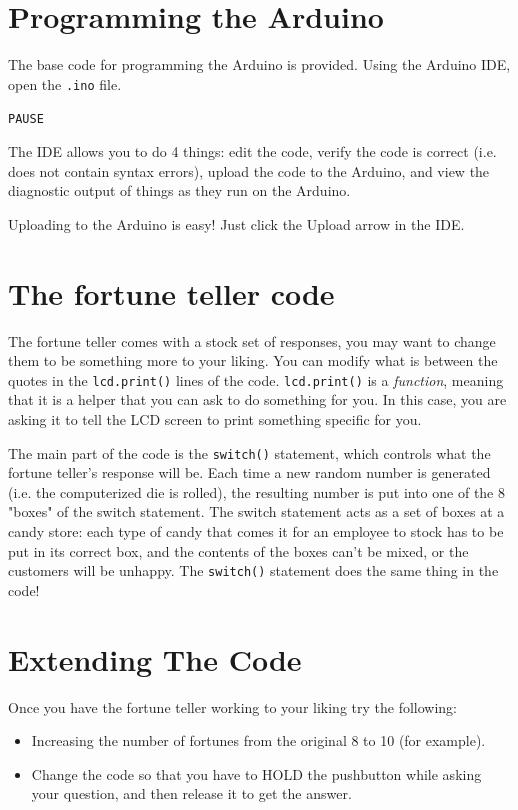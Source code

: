 \documentclass[11pt]{article}
\begin{document}
\section{Programming the Arduino}
\label{sec:org654036c}

The base code for programming the Arduino is provided. Using the Arduino IDE, open the \texttt{.ino} file.

\texttt{PAUSE}

The IDE allows you to do 4 things: edit the code, verify the code is correct (i.e. does not contain syntax
errors), upload the code to the Arduino, and view the diagnostic output of things as they run on the Arduino.

Uploading to the Arduino is easy! Just click the Upload arrow in the IDE.

\section{The fortune teller code}
\label{sec:org4ee1087}

The fortune teller comes with a stock set of responses, you may want to change them to be something more to your
liking. You can modify what is between the quotes in the \texttt{lcd.print()} lines of the code. \texttt{lcd.print()} is a \emph{function},
meaning that it is a helper that you can ask to do something for you. In this case, you are asking it to tell the LCD
screen to print something specific for you.

The main part of the code is the \texttt{switch()} statement, which controls what the fortune teller's response will be. Each
time a new random number is generated (i.e. the computerized die is rolled), the resulting number is put into one of the
8 "boxes" of the switch statement. The switch statement acts as a set of boxes at a candy store: each type of candy that
comes it for an employee to stock has to be put in its correct box, and the contents of the boxes can't be mixed, or the
customers will be unhappy. The \texttt{switch()} statement does the same thing in the code!

\section{Extending The Code}
\label{sec:org5e8d97d}

Once you have the fortune teller working to your liking try the following:

\begin{itemize}
\item Increasing the number of fortunes from the original 8 to 10 (for example).
\item Change the code so that you have to HOLD the pushbutton while asking your question, and then release it to get the
answer.
\end{itemize}
\end{document}
